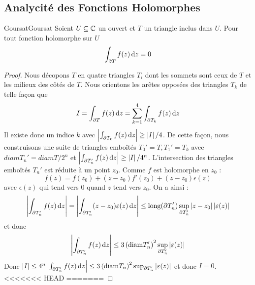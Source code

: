\documentclass{cours}
\begin{document}
\subsection{Analycité des Fonctions Holomorphes}
\begin{lemme}{Goursat}{Goursat}
    Soient $U \subseteq \mathbb{C}$ un ouvert et $T$ un triangle inclus dans $U$. Pour tout fonction holomorphe sur $U$
    \[
        \int_{\partial T}f(z){\rm \, d} z = 0
    \]
\end{lemme}
\begin{proof}
    Nous décopons $T$ en quatre triangles $T_{i}$ dont les sommets sont ceux de $T$ et les milieux des côtés de $T$. Nous orientons les arêtes opposées des triangles $T_{k}$ de telle façon que 
    \[
        I = \int_{\partial T}f(z){\rm \, d} z = \sum_{k = 1}^{4}\int_{\partial T_{k}}f(z){\rm \, d} z
    \]
    Il existe donc un indice $k$ avec $\left|\int_{\partial T_{k}}f(z){\rm \, d} z\right| \geq \left|I\right|/4$. De cette façon, nous construisons une suite de triangles emboîtés $T_{0}' = T, T_{1}' = T_{k}$ avec $diam T_{n}' = diam T/2^{n}$ et $\left|\int_{\partial T_{n}'} f(z){\rm \, d} z\right| \geq \left|I\right|/4^{n}$.
	L'intersection des triangles emboîtés $T_{n}'$ est réduite à un point $z_{0}$. Comme $f$ est holomorphe en $z_{0}$ : 
	\[
		f(z) = f(z_{0}) + (z - z_{0})f'(z_{0}) + (z - z_{0})\epsilon(z)
	\]
	avec $\epsilon(z)$ qui tend vers $0$ quand $z$ tend vers $z_{0}$.  
	On a ainsi :
	\[
		\left|\int_{\partial T_{n}'} f(z){\rm \, d} z\right| = \left|\int_{\partial T_{n}'} (z - z_{0}) \varepsilon(z) {\rm \, d} z\right| \leq {\rm long}(\partial T_{n}') \sup_{\partial T_{n}'} \left|z - z_{0}\right|\left|\varepsilon(z)\right|
	\]
	et donc 
	\[
		\left|\int_{\partial T_{n}'} f(z){\rm \, d} z\right|\leq 3 \left({\rm diam}T_{n}'\right)^{2}\sup_{\partial T_{n}'}\left|\varepsilon(z)\right|
	\]
	Donc $\left|I\right| \leq 4^{n}\left|\int_{\partial T_{n}'} f(z) {\rm \, d} z\right| \leq 3 \left({\rm diam}T_{n}\right)^{2}\sup_{\partial T_{n}'}\left|\varepsilon(z)\right|$ et donc $I = 0$.
<<<<<<< HEAD
=======
\end{proof}
\end{document}
